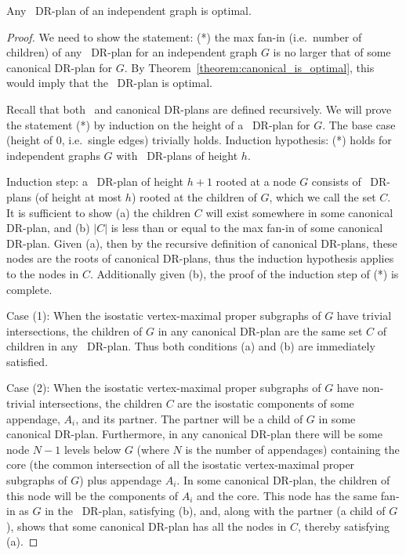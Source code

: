 \begin{observation}
    Any \pseudosequential\ DR-plan of an independent graph is optimal.
\end{observation}

\begin{proof}
    We need to show the statement:
    (*) the max fan-in (i.e.\ number of children) of any \pseudosequential\ DR-plan for an independent graph $G$ is no larger that of some canonical DR-plan for $G$. By Theorem~\ref{theorem:canonical_is_optimal}, this would imply that the \pseudosequential\ DR-plan is optimal.

    Recall that both \pseudosequential\ and canonical DR-plans are defined recursively. We will prove the statement (*) by induction on the height of a \pseudosequential\ DR-plan for $G$. The base case (height of 0, i.e.\ single edges) trivially holds. Induction hypothesis: (*) holds for independent graphs $G$ with \pseudosequential\ DR-plans of height $h$.

    Induction step: a \pseudosequential\ DR-plan of height $h+1$ rooted at a node $G$ consists of \pseudosequential\ DR-plans (of height at most $h$) rooted at the children of $G$, which we call the set $C$. It is sufficient to show (a) the children $C$ will exist somewhere in some canonical DR-plan, and (b) $|C|$ is less than or equal to the max fan-in of some canonical DR-plan. Given (a), then by the recursive definition of canonical DR-plans, these nodes are the roots of canonical DR-plans, thus the induction hypothesis applies to the nodes in $C$. Additionally given (b), the proof of the induction step of (*) is complete.

    Case (1):
    When the isostatic vertex-maximal proper subgraphs of $G$ have trivial intersections, the children of $G$ in any canonical DR-plan are the same set $C$ of children in any \pseudosequential\ DR-plan. Thus both conditions (a) and (b) are immediately satisfied.

    Case (2):
    When the isostatic vertex-maximal proper subgraphs of $G$ have non-trivial intersections, the children $C$ are the isostatic components of some appendage, $A_i$, and its partner. The partner will be a child of $G$ in some canonical DR-plan. Furthermore, in any canonical DR-plan there will be some node $N-1$ levels below $G$ (where $N$ is the number of appendages) containing the core (the common intersection of all the isostatic vertex-maximal proper subgraphs of $G$) plus appendage $A_i$. In some canonical DR-plan, the children of this node will be the components of $A_i$ and the core. This node has the same fan-in as $G$ in the \pseudosequential\ DR-plan, satisfying (b), and, along with the partner (a child of $G$), shows that some canonical DR-plan has all the nodes in $C$, thereby satisfying (a).
\end{proof}

